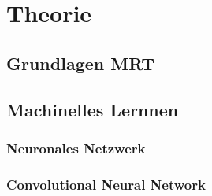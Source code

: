 \chapter{Theorie}

\section{Grundlagen MRT}

\section{Machinelles Lernnen}

\subsection{Neuronales Netzwerk}

\subsection{Convolutional Neural Network}